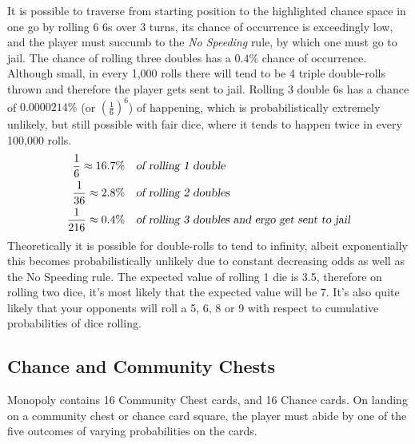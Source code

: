 \documentclass[12pt]{article}
\begin{document}
It is possible to traverse from starting position to the highlighted chance space in one go by rolling 6 6s over 3 turns, its chance of occurrence is exceedingly low, and the player must succumb to the \emph{No Speeding} rule, by which one must go to jail. The chance of rolling three doubles has a $0.4\%$ chance of occurrence. Although small, in every 1,000 rolls there will tend to be 4 triple double-rolls thrown and therefore the player gets sent to jail. Rolling 3 double 6s has a chance of $0.0000214\%$ (or $\left(\frac{1}{6}\right)^{6}$) of happening, which is probabilistically extremely unlikely, but still possible with fair dice, where it tends to happen twice in every 100,000 rolls.
\begin{align*}
\frac{1}{6}\approx16.7\% \quad &\textsl{of rolling 1 double}\\
\frac{1}{36}\approx2.8\% \quad &\textsl{of rolling 2 doubles}\\
\frac{1}{216}\approx0.4\% \quad &\textsl{of rolling 3 doubles and ergo get sent to jail} 
\end{align*}
Theoretically it is possible for double-rolls to tend to infinity, albeit exponentially this becomes probabilistically unlikely due to constant decreasing odds as well as the No Speeding rule.
The expected value of rolling 1 die is 3.5, therefore on rolling two dice, it's most likely that the expected value will be 7. It's also quite likely that your opponents will roll a 5, 6, 8 or 9 with respect to cumulative probabilities of dice rolling.
\subsection{Chance and Community Chests}
Monopoly contains 16 Community Chest cards, and 16 Chance cards. On landing on a community chest or chance card square, the player must abide by one of the five outcomes of varying probabilities on the cards.
\end{document}
